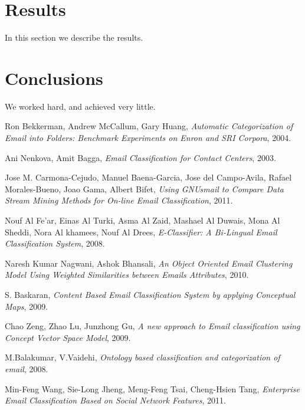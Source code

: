 \documentclass[12pt]{article}
\begin{document}

\section{Results}\label{results}
In this section we describe the results.

\section{Conclusions}\label{conclusions}
We worked hard, and achieved very little.


\begin{thebibliography}{99}
  Ron Bekkerman,
  Andrew McCallum,
  Gary Huang,
  \emph{Automatic Categorization of Email into Folders: Benchmark Experiments on Enron and SRI Corpora},
  2004.

  Ani Nenkova,
  Amit Bagga,
  \emph{Email Classification for Contact Centers},
  2003.

  Jose M. Carmona-Cejudo,
  Manuel Baena-Garcia,
  Jose del Campo-Avila,
  Rafael Morales-Bueno,
  Joao Gama,
  Albert Bifet,
  \emph{Using GNUsmail to Compare Data Stream Mining Methods for On-line Email Classification},
  2011.

  Nouf Al Fe'ar,
  Einas Al Turki,
  Asma Al Zaid,
  Mashael Al Duwais,
  Mona Al Sheddi,
  Nora Al khamees,
  Nouf Al Drees,
  \emph{E-Classifier: A Bi-Lingual Email Classification System},
  2008.

  Naresh Kumar Nagwani,
  Ashok Bhansali,
  \emph{An Object Oriented Email Clustering Model Using Weighted Similarities between Emails Attributes},
  2010.


  S. Baskaran,
  \emph{Content Based Email Classification System by applying Conceptual Maps},
  2009.

  Chao Zeng,
  Zhao Lu,
  Junzhong Gu,
  \emph{A new approach to Email classification using Concept Vector Space Model},
  2009.

  M.Balakumar,
  V.Vaidehi,
  \emph{Ontology based classification and categorization of email},
  2008.

  Min-Feng Wang,
  Sie-Long Jheng,
  Meng-Feng Tsai,
  Cheng-Hsien Tang,
  \emph{Enterprise Email Classification Based on Social Network Features},
  2011.


\end{thebibliography}
\end{document}
